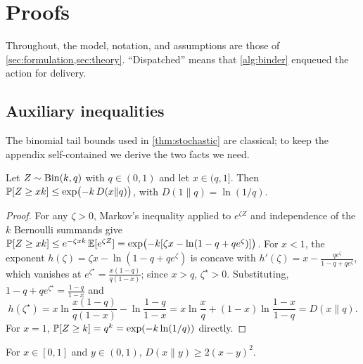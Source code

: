 \section{Proofs}\label{app:proofs}

Throughout, the model, notation, and assumptions are those of \cref{sec:formulation,sec:theory}. ``Dispatched'' means that \cref{alg:binder} enqueued the action for delivery.

\subsection{Auxiliary inequalities}

The binomial tail bounds used in \cref{thm:stochastic} are classical; to keep the appendix self-contained we derive the two facts we need.

\begin{lemma}\label{lem:chernoff}
Let $Z\sim\operatorname{Bin}(k,q)$ with $q\in(0,1)$ and let $x\in(q,1]$. Then $\mathbb{P}[Z\ge xk]\le\exp\bigl(-k\,D(x\|q)\bigr)$, with $D(1\|q)=\ln(1/q)$.
\end{lemma}

\begin{proof}
For any $\zeta>0$, Markov's inequality applied to $e^{\zeta Z}$ and independence of the $k$ Bernoulli summands give $\mathbb{P}[Z\ge xk]\le e^{-\zeta xk}\,\mathbb{E}[e^{\zeta Z}]=\exp\bigl(-k[\zeta x-\ln(1-q+qe^{\zeta})]\bigr)$. For $x<1$, the exponent $h(\zeta)=\zeta x-\ln(1-q+qe^\zeta)$ is concave with $h'(\zeta)=x-\frac{qe^\zeta}{1-q+qe^\zeta}$, which vanishes at $e^{\zeta^\star}=\frac{x(1-q)}{q(1-x)}$; since $x>q$, $\zeta^\star>0$. Substituting, $1-q+qe^{\zeta^\star}=\frac{1-q}{1-x}$ and
\[
h(\zeta^\star)=x\ln\frac{x(1-q)}{q(1-x)}-\ln\frac{1-q}{1-x}=x\ln\frac{x}{q}+(1-x)\ln\frac{1-x}{1-q}=D(x\|q).
\]
For $x=1$, $\mathbb{P}[Z\ge k]=q^k=\exp(-k\ln(1/q))$ directly.
\end{proof}

\begin{lemma}\label{lem:pinsker}
For $x\in[0,1]$ and $y\in(0,1)$, $D(x\|y)\ge 2(x-y)^2$.
\end{lemma}

